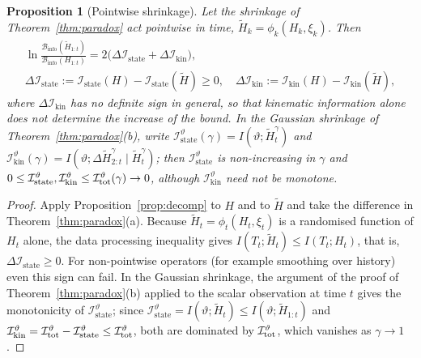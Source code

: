 \documentclass[preprint,12pt]{elsarticle}
\newtheorem{proposition}{Proposition}
\theoremstyle{definition}
\newcommand{\Binfo}{\mathcal{B}_{\mathrm{info}}}
\newcommand{\Istate}{\mathcal{I}_{\mathrm{state}}}
\newcommand{\Ikin}{\mathcal{I}_{\mathrm{kin}}}
\begin{document}
\begin{proposition}[Pointwise shrinkage]
\label{prop:pointwise}
Let the shrinkage of Theorem~\ref{thm:paradox} act pointwise in time, $\tilde H_k=\phi_k(H_k,\xi_k)$. Then
\begin{equation}
\begin{gathered}\ln\frac{\Binfo(\tilde H_{1:t})}{\Binfo(H_{1:t})}=2\big(\Delta\Istate+\Delta\Ikin\big),\\ \Delta\Istate:=\Istate(H)-\Istate(\tilde H)\ge0,\quad \Delta\Ikin:=\Ikin(H)-\Ikin(\tilde H),\end{gathered}
\end{equation}
where $\Delta\Ikin$ has no definite sign in general, so that kinematic information alone does not determine the increase of the bound. In the Gaussian shrinkage of Theorem~\ref{thm:paradox}(b), write $\Istate^\vartheta(\gamma)=I(\vartheta;\tilde H^\gamma_t)$ and $\Ikin^\vartheta(\gamma)=I(\vartheta;\Delta\tilde H^\gamma_{2:t}\mid\tilde H^\gamma_t)$; then $\Istate^\vartheta$ is non-increasing in $\gamma$ and $0\le\Istate^\vartheta,\Ikin^\vartheta\le\mathcal I^\vartheta_{\rm tot}(\gamma)\to0$, although $\Ikin^\vartheta$ need not be monotone.
\end{proposition}
\begin{proof}
Apply Proposition~\ref{prop:decomp} to $H$ and to $\tilde H$ and take the difference in Theorem~\ref{thm:paradox}(a). Because $\tilde H_t=\phi_t(H_t,\xi_t)$ is a randomised function of $H_t$ alone, the data processing inequality gives $I(T_t;\tilde H_t)\le I(T_t;H_t)$, that is, $\Delta\Istate\ge0$. For non-pointwise operators (for example smoothing over history) even this sign can fail. In the Gaussian shrinkage, the argument of the proof of Theorem~\ref{thm:paradox}(b) applied to the scalar observation at time $t$ gives the monotonicity of $\Istate^\vartheta$; since $\Istate^\vartheta=I(\vartheta;\tilde H_t)\le I(\vartheta;\tilde H_{1:t})$ and $\Ikin^\vartheta=\mathcal I_{\rm tot}^\vartheta-\Istate^\vartheta\le\mathcal I_{\rm tot}^\vartheta$, both are dominated by $\mathcal I_{\rm tot}^\vartheta$, which vanishes as $\gamma\to1$.
\end{proof}
\end{document}
